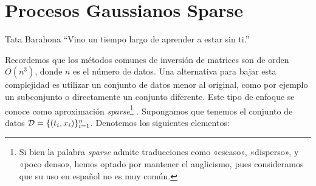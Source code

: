 
\chapter{Procesos Gaussianos Sparse}

\begin{chapquote}{Tata Barahona}
	``Vino un tiempo largo de aprender a estar sin ti.''
\end{chapquote}



Recordemos que los métodos comunes de inversión de matrices son de orden \(O(n^{3})\), donde \(n\) es el número de datos. Una alternativa para bajar esta complejidad es utilizar un conjunto de datos menor al original, como por ejemplo un subconjunto o directamente un conjunto diferente. Este tipo de enfoque se conoce como aproximación \emph{sparse}\footnote{Si bien la palabra \emph{sparse} admite traducciones como «escaso», «disperso», y «poco denso», hemos optado por mantener el anglicismo, pues consideramos que su uso en español no es muy común.} \cite{22} \cite{32}. Supongamos que tenemos el conjunto de datos \(\mathcal{D} = \{(t_{i}, x_{i})\}_{i=1}^n\). Denotemos los siguientes elementos:

